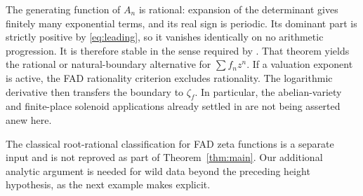 The generating function of \(A_n\) is rational: expansion of the
determinant gives finitely many exponential terms, and its real
sign is periodic. Its dominant part is strictly positive by
\eqref{eq:leading}, so it vanishes identically on no arithmetic
progression. It is therefore stable in the sense required by
\citep[Theorem 2.14]{bhn2025}. That theorem yields the rational or
natural-boundary alternative for \(\sum f_nz^n\).
If a valuation exponent is active, the FAD rationality criterion
\citep[Proposition 11.3.3]{bch2024} excludes rationality.
The logarithmic derivative then transfers the boundary to
\(\zeta_f\). In particular, the abelian-variety and finite-place
solenoid applications already settled in \citep{bhn2025} are not
being asserted anew here.

The classical root-rational classification for FAD zeta functions
\citep[Theorem 11.3.4]{bch2024} is a separate input and is not reproved
as part of Theorem~\ref{thm:main}. Our additional analytic argument
is needed for wild data beyond the preceding height hypothesis,
as the next example makes explicit.

